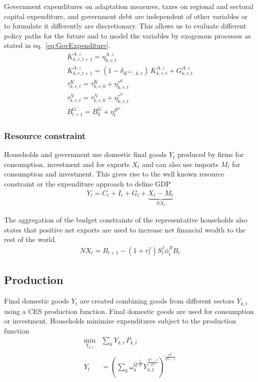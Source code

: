 \documentclass[10pt,a4paper]{article}
\begin{document}
Government expenditures on adaptation measures, taxes on regional and sectoral capital expenditure, and government debt are independent of other variables or to formulate it differently are discretionary. This allows us to evaluate different policy paths for the future and to model the variables by exogenous processes as stated in eq.~\ref{eq:GovExpenditure}.
\begin{align}\label{eq:GovExpenditure}
K^{A,z}_{k,r,t+1} = \eta^{A,z}_{k,r,t} \nonumber \\
K^{A,z}_{k,r,t+1} = (1 - \delta_{K^{A,z},k,r}) \, K^{A,z}_{k,r,t} + G^{A,z}_{k,r,t} \nonumber \\
\tau^{K}_{k,r,t} = \tau^{K}_{k,r,0} + \eta^{\tau^{K}}_{k,r,t} \nonumber \\
\tau^{N}_{k,r,t} = \tau^{N}_{k,r,0} + \eta^{\tau^{N}}_{k,r,t} \nonumber \\
B^G_{t+1} = B^G_{0} + \eta^{B^{G}}_{t}
\end{align} 

\subsubsection{Resource constraint}

Households and government use domestic final goods $Y_t$ produced by firms for consumption, investment and for exports $X_{t}$ and can also use imports $M_t$ for consumption and investment. This gives rise to the well known resource constraint or the expenditure approach to define GDP 
\begin{align}
Y_{t} = C_{t} + I_{t} + G_{t} + \underbrace{X_{t} - M_{t}}_{NX_{t}}
\end{align}

The aggregation of the budget constraints of the representative households also states that positive net exports are used to increase net financial wealth to the rest of the world.
\begin{align}
NX_t = B_{t+1} - (1 + r^{f}_{t}) S^{f}_{t} \phi^B_{t} B_{t}
\end{align}

\subsection{Production}

Final domestic goods $Y_{t}$ are created combining goods from different sectors $Y_{k,t}$ using a CES production function. Final domestic goods are used for consumption or investment. Households minimize expenditures subject to the production function
\begin{align}
\underset{Y_{k,t}}{\mathrm{min}} & \sum_{k} Y_{k,t} \, P_{k,t} \\ 
Y_{t} &= \left(\sum_{k} {\omega^{Q}_{k}}^{\frac{1}{\eta^Q}} Y_{k,t}^{\frac{\eta^Q-1}{\eta^Q}} \right)^{\frac{\eta^Q}{\eta^Q-1}}
\end{align}
\end{document}
